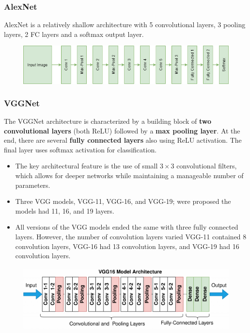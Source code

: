 \subsubsection*{AlexNet}

AlexNet is a relatively shallow architecture with 5 convolutional layers, 3 pooling layers, 2 FC layers and a softmax output layer.

\begin{figure}[H]
  \centering
  \includegraphics[width=\linewidth]{images/alexnet.png}
\end{figure}

\subsubsection*{VGGNet}

The VGGNet architecture is characterized by a building block of \textbf{two convolutional layers} (both ReLU) followed by a \textbf{max pooling layer}. At the end, there are several \textbf{fully connected layers} also using ReLU activation. The final layer uses softmax activation for classification.

\begin{itemize}

  \item The key architectural feature is the use of small $3 \times 3$ convolutional filters, which allows for deeper networks while maintaining a manageable number of parameters.

  \item Three VGG models, VGG-11, VGG-16, and VGG-19; were proposed the models had 11, 16, and 19 layers.

  \item All versions of the VGG models ended the same with three fully connected layers. However, the number of convolution layers varied VGG-11 contained 8 convolution layers, VGG-16 had 13 convolution layers, and VGG-19 had 16 convolution layers.

\end{itemize}

\begin{figure}[H]
  \centering
  \includegraphics[width=\linewidth]{images/vgg16.png}
\end{figure}

